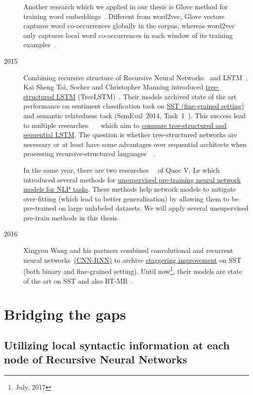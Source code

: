 \begin{description}
Another research which we applied in our thesis is Glove method for training word embeddings~\cite{glove}.
Different from word2vec, Glove vectors captures word co-occurrences globally in the corpus, whereas word2vec only captures local word co-occurrences in each window of its training examples~\cite{glove}.

\item [2015] Combining recursive structure of Recursive Neural Networks~\cite{socher2013recursive} and LSTM~\cite{originLSTM}, Kai Sheng Tai, Socher and Christopher Manning introduced \hyperref[sec:treelstm]{tree-structured LSTM}  (TreeLSTM)~\cite{treeLSTM}.
Their models archived state of the art performance on sentiment classification task on \hyperref[sec:sst]{SST (fine-grained setting)} and semantic relatedness task (SemEval~2014, Task~1~\cite{SemeEvalTask1}).
This success lead to multiple researches~\cite{need-tree}~\cite{bowman-treevslstm}~\cite{Graves_Nature2016} which aim to \hyperref[treelstm-advantage]{compare tree-structured and sequential LSTM}.
The question is whether tree-structured networks are necessary or at least have some advantages over sequential architects when processing recursive-structured languages~\cite{need-tree}~\cite{bowman-treevslstm}.

In the same year, there are two researches~\cite{ParagraphVec}~\cite{semisup-seq2seq} of Quoc V. Le which introduced several methods for \hyperref[sec:unsupervised-pretrain]{unsupervised pre-training neural network models for NLP tasks}.
These methods help network models to mitigate over-fitting (which lead to better generalization) by allowing them to be pre-trained on large unlabeled datasets.
We will apply several unsupervised pre-train methods in this thesis.

\item [2016] Xingyou Wang and his partners combined convolutional and recurrent neural networks~\hyperref[cnn-rnn]{(CNN-RNN)} to archive \hyperref[table:cnn-rnn]{staggering improvement} on SST (both binary and fine-grained setting).
Until now\footnote{July, 2017}, their models are state of the art on SST and also RT-MR~\cite{cnn-rnn}.
\end{description}

\section{Bridging the gaps}
\subsection{Utilizing local syntactic information at each node of Recursive Neural Networks}

